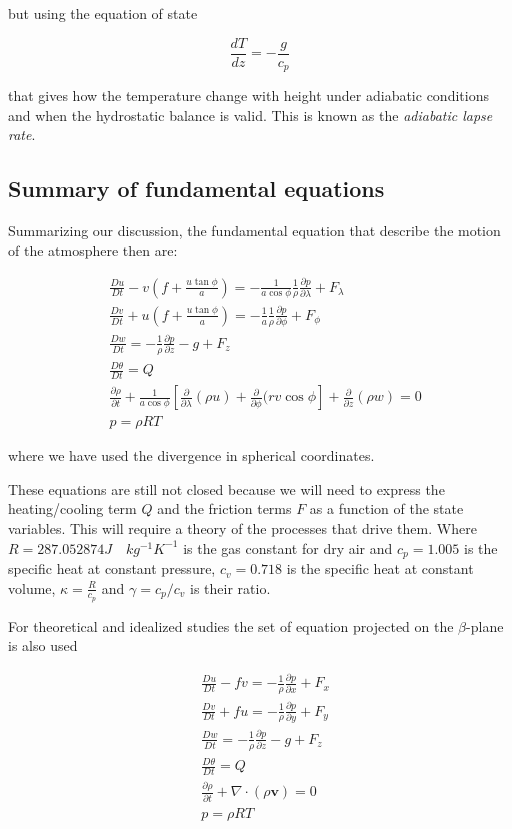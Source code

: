 but using the equation of state

\[\frac{d T}{dz} = -\frac{g}{c_p}\]

that gives how the temperature change with height under adiabatic
conditions and when the hydrostatic balance is valid. This is known as
the \emph{adiabatic lapse rate}.

\subsection{Summary of fundamental
equations}\label{summary-of-fundamental-equations}

Summarizing our discussion, the fundamental equation that describe the
motion of the atmosphere then are:

\[\begin{aligned}
&\frac{D u}{Dt} - v\left(f +  \frac{u \tan{\phi}}{a}\right)  = -\frac{1}{ a \cos{\phi}}\frac{1}{\rho}\frac{\partial p}{\partial \lambda}   + F_\lambda \\
&\frac{D v}{Dt} + u\left( f + \frac{u \tan{\phi}}{a}\right)  = -\frac{1}{a}\frac{1}{\rho}\frac{\partial p}{\partial \phi}  + F_\phi \\
&\frac{D w}{Dt}  = -\frac{1}{\rho }\frac{\partial p}{\partial z} -g  + F_z \label{Eq:PrimEq}\\
&\frac{D \theta}{Dt} = Q \\
&\frac{\partial \rho}{\partial t}+\frac{1}{a\cos{\phi}}\left[ \frac{\partial }{\partial \lambda}(\rho u) + \frac{\partial }{\partial \phi}(rv\cos{\phi} \right] +\frac{\partial }{\partial z}(\rho w) = 0 \\
&p = \rho R T
\end{aligned}\]

where we have used the divergence in spherical coordinates.

These equations are still not closed because we will need to express the
heating/cooling term \(Q\) and the friction terms \(F\) as a function of
the state variables. This will require a theory of the processes that
drive them. Where \(R=287.052874 J \quad kg^{-1} K^{-1}\) is the gas
constant for dry air and \(c_p = 1.005\) is the specific heat at
constant pressure, \(c_v = 0.718\) is the specific heat at constant
volume, \(\kappa = \frac{R}{c_p}\) and \(\gamma=c_p/c_v\) is their
ratio.

For theoretical and idealized studies the set of equation projected on
the \(\beta\)-plane is also used

\[\begin{aligned}
&\frac{D u}{Dt} - fv  = -\frac{1}{\rho}\frac{\partial p}{\partial x}   + F_x \\
&\frac{D v}{Dt} + fu = -\frac{1}{\rho}\frac{\partial p}{\partial y}  + F_y \\
&\frac{D w}{Dt}  = -\frac{1}{\rho }\frac{\partial p}{\partial z} -g  + F_z \\
&\frac{D \theta}{Dt} = Q\\
&\frac{\partial \rho}{\partial t}+\nabla\cdot(\rho\mathbf{v}) = 0\\
&p = \rho R T
\end{aligned}\]

